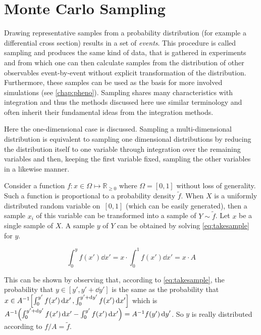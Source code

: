 \section{Monte Carlo Sampling}%
\label{sec:mcsamp}

Drawing representative samples from a probability distribution (for
example a differential cross section) results in a set of
\emph{events}. This procedure is called sampling and produces the same
kind of data, that is gathered in experiments and from which one can
then calculate samples from the distribution of other observables
event-by-event without explicit transformation of the
distribution. Furthermore, these samples can be used as the basis for
more involved simulations (see \cref{chap:pheno}). Sampling shares
many characteristics with integration and thus the methods discussed
here use similar terminology and often inherit their fundamental ideas
from the integration methods.

Here the one-dimensional case is discussed.  Sampling a
multi-dimensional distribution is equivalent to sampling one
dimensional distributions by reducing the distribution itself to one
variable through integration over the remaining variables and then,
keeping the first variable fixed, sampling the other variables in a
likewise manner.

Consider a function \(f\colon x\in\Omega\mapsto\mathbb{R}_{\geq 0}\)
where \(\Omega = [0, 1]\) without loss of generality. Such a function
is proportional to a probability density \(\tilde{f}\). When \(X\) is
a uniformly distributed random variable on~\([0, 1]\) (which can be
easily generated), then a sample \({x_i}\) of this variable can be
transformed into a sample of \(Y\sim\tilde{f}\). Let \(x\) be a single
sample of \(X\). A sample \(y\) of \(Y\) can be obtained by
solving \cref{eq:takesample} for \(y\).

\begin{equation}
  \label{eq:takesample}
  \int_{0}^{y}f(x')\dd{x'} = x\cdot\int_0^1f(x')\dd{x'} = x\cdot A
\end{equation}

This can be shown by observing that, according
to \cref{eq:takesample}, the probability that
\(y\in[y', y'+\dd{y}']\) is the same as the probability that
\(x\in A^{-1}\qty[\int_{0}^{y'}f(x')\dd{x'},
\int_{0}^{y'+\dd{y}'}f(x')\dd{x'}]\) which is
\(A^{-1}\qty(\int_{0}^{y'+\dd{y}'}f(x')\dd{x'} -
\int_{0}^{y'}f(x')\dd{x'}) = A^{-1} f(y')\dd{y}'\). So \(y\) is really
distributed according to \(f/A=\tilde{f}\).

